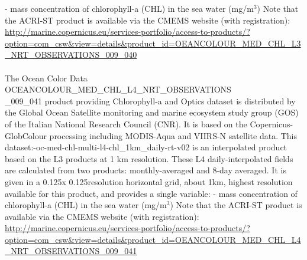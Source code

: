 \documentclass[12pt,a4paper]{article}
\begin{document}
- mass concentration of chlorophyll-a (CHL) in the sea water (mg/m$^{3}$) \newline
Note that the ACRI-ST product is available via the CMEMS website  (with 
registration): \url{http://marine.copernicus.eu/services-portfolio/access-to-products/?option=com_csw&view=details&product_id=OEANCOLOUR\_MED\_CHL\_L3\_NRT\_OBSERVATIONS\_009\_040}
\\
\\
The Ocean Color Data OCEANCOLOUR\_MED\_CHL\_L4\_NRT\_OBSERVATIONS \\ \_009\_041 product providing Chlorophyll-a and Optics dataset is distributed by the Global Ocean Satellite monitoring and marine ecosystem study group (GOS) of the Italian National Research Council (CNR). It is based on the Copernicus-GlobColour processing including MODIS-Aqua and VIIRS-N satellite data. \newline 
This dataset:-oc-med-chl-multi-l4-chl\_1km\_daily-rt-v02 is an interpolated product based on the L3 products at 1 km resolution. These L4 daily-interpolated fields are calculated from two products: monthly-averaged and 8-day averaged. It is given in a 0.125\degre x 0.125\degre  resolution horizontal grid, about 1km, highest resolution available for this product, and provides a single variable: \newline
- mass concentration of chlorophyll-a (CHL) in the sea water (mg/m$^{3}$) \newline
Note that the ACRI-ST product is available via the CMEMS website  (with 
registration): \url{http://marine.copernicus.eu/services-portfolio/access-to-products/?option=com_csw&view=details&product_id=OEANCOLOUR\_MED\_CHL\_L4\_NRT\_OBSERVATIONS\_009\_041}
\\
\\
\end{document}
